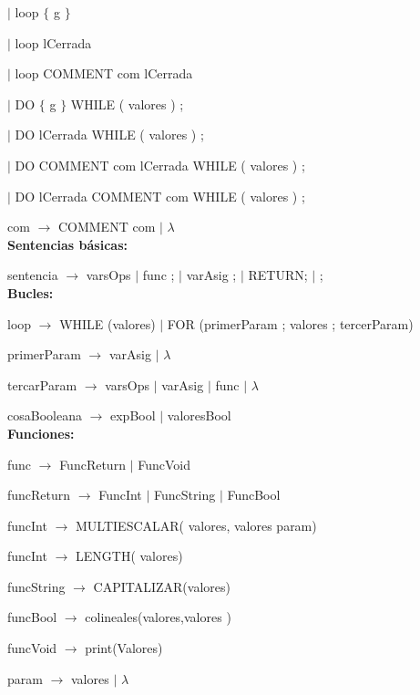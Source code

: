 \hspace{15mm}$|$ loop $\{$ g $\}$ 

\hspace{15mm}$|$ loop lCerrada 

\hspace{15mm}$|$ loop COMMENT com lCerrada

\hspace{15mm}$|$ DO $\{$ g $\}$ WHILE ( valores ) ;
  
\hspace{15mm}$|$ DO lCerrada WHILE ( valores ) ;  
  
\hspace{15mm}$|$  DO COMMENT com lCerrada WHILE ( valores ) ;

\hspace{15mm}$|$  DO lCerrada COMMENT com  WHILE ( valores ) ;

com $\rightarrow$  COMMENT com $|$ $\lambda$ \\

\textbf{Sentencias básicas:}

sentencia $\rightarrow$ varsOps $|$ func ; $|$ varAsig ; $|$ RETURN; $|$ ; \\


\textbf{Bucles:}

loop $\rightarrow$ WHILE (valores) $|$ FOR (primerParam ; valores ; tercerParam)

primerParam $\rightarrow$  varAsig $|$ $\lambda$

tercarParam $\rightarrow$  varsOps $|$ varAsig $|$ func $|$ $\lambda$

cosaBooleana $\rightarrow$ expBool $|$ valoresBool \\
  

\textbf{Funciones:}

func $\rightarrow$ FuncReturn $|$ FuncVoid

funcReturn $\rightarrow$ FuncInt $|$ FuncString $|$ FuncBool

funcInt $\rightarrow$ MULTIESCALAR( valores, valores param)

funcInt $\rightarrow$ LENGTH( valores)

funcString $\rightarrow$ CAPITALIZAR(valores)

funcBool $\rightarrow$ colineales(valores,valores )

funcVoid $\rightarrow$ print(Valores) 

param $\rightarrow$ valores $|$ $\lambda$ \\

